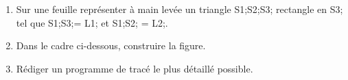 \documentclass[exercice]{thedocument}%
\begin{document}
%
    \begin{enumerate}
        \item Sur une feuille représenter à main levée un triangle
        {\<S1;\<S2;\<S3;} rectangle en {\<S3;} tel que {\<S1;\<S3;}=
        {\<L1;} et {\<S1;\<S2;} = \<L2;.
        \item Dans le cadre ci-dessous, construire la figure.
        \item Rédiger un programme de tracé le plus détaillé possible.
    \end{enumerate}
    \begin{mdframed}
        \vspace{8cm}
    \end{mdframed}
\end{document}
